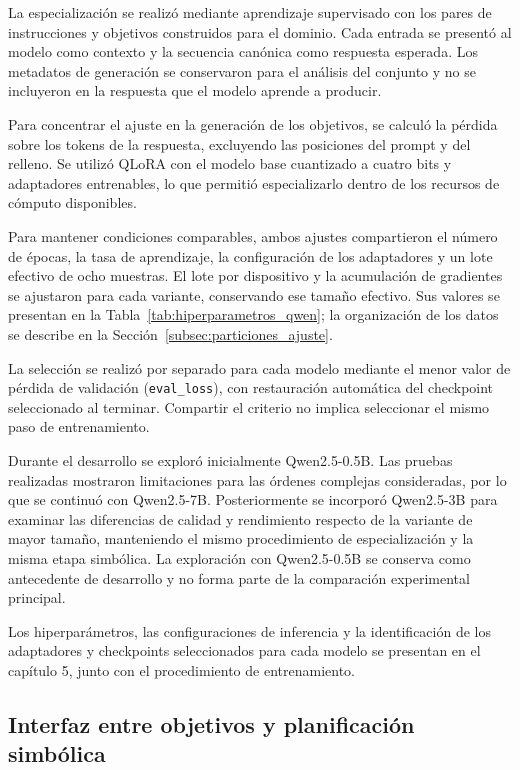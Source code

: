 La especialización se realizó mediante aprendizaje supervisado con los
pares de instrucciones y objetivos construidos para el dominio. Cada
entrada se presentó al modelo como contexto y la secuencia canónica como
respuesta esperada. Los metadatos de generación se conservaron para el
análisis del conjunto y no se incluyeron en la respuesta que el modelo
aprende a producir.

Para concentrar el ajuste en la generación de los objetivos, se calculó
la pérdida sobre los tokens de la respuesta, excluyendo las posiciones
del prompt y del relleno. Se utilizó QLoRA \cite{dettmers2023qlora} con el modelo base cuantizado
a cuatro bits y adaptadores entrenables, lo que permitió especializarlo
dentro de los recursos de cómputo disponibles.

Para mantener condiciones comparables, ambos ajustes compartieron el
número de épocas, la tasa de aprendizaje, la configuración de los
adaptadores y un lote efectivo de ocho muestras. El lote por dispositivo
y la acumulación de gradientes se ajustaron para cada variante,
conservando ese tamaño efectivo. Sus valores se presentan en la
Tabla~\ref{tab:hiperparametros_qwen}; la organización de los datos se
describe en la Sección~\ref{subsec:particiones_ajuste}.

La selección se realizó por separado para cada modelo mediante el menor valor de pérdida de validación (\texttt{eval\_loss}), con restauración automática del checkpoint seleccionado al terminar. Compartir el criterio no implica seleccionar el mismo paso de entrenamiento.

Durante el desarrollo se exploró inicialmente Qwen2.5-0.5B.
Las pruebas realizadas mostraron limitaciones para las órdenes
complejas consideradas, por lo que se continuó con Qwen2.5-7B.
Posteriormente se incorporó Qwen2.5-3B para examinar las diferencias
de calidad y rendimiento respecto de la variante de mayor tamaño,
manteniendo el mismo procedimiento de especialización y la misma
etapa simbólica. La exploración con Qwen2.5-0.5B se conserva como
antecedente de desarrollo y no forma parte de la comparación
experimental principal.

Los hiperparámetros, las configuraciones de inferencia y la
identificación de los adaptadores y checkpoints seleccionados para
cada modelo se presentan en el capítulo 5, junto con el procedimiento
de entrenamiento.


\subsection{Interfaz entre objetivos y planificación simbólica}


